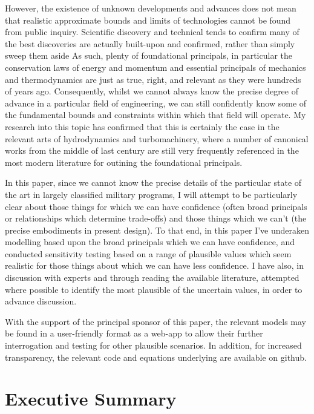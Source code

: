 \documentclass{article}\usepackage[]{graphicx}\usepackage[]{color}
\begin{document}
However, the existence of unknown developments and advances does not mean that realistic approximate bounds and limits of technologies cannot be found from public inquiry.  Scientific discovery and technical tends to confirm many of the best discoveries are actually built-upon and confirmed, rather than simply sweep them aside  As such, plenty of foundational principals, in particular the conservation laws of energy and momentum and essential principals of mechanics and thermodynamics are just as true, right, and relevant as they were hundreds of years ago.  Consequently, whilst we cannot always know the precise degree of advance in a particular field of engineering, we can still confidently know some of the fundamental bounds and constraints within which that field will operate.  My research into this topic has confirmed that this is certainly the case in the relevant arts of hydrodynamics and turbomachinery, where a number of canonical works from the middle of last century are still very frequently referenced in the most modern literature for outining the foundational principals.

In this paper, since we cannot know the precise details of the particular state of the art in largely classified military programs, I will attempt to be particularly clear about those things for which we can have confidence (often broad principals or relationships which determine trade-offs) and those things which we can't (the precise embodiments in present design).  To that end, in this paper I've underaken modelling based upon the broad principals which we can have confidence, and conducted sensitivity testing based on a range of plausible values which seem realistic for those things about which we can have less confidence. I have also, in discussion with experts and through reading the available literature, attempted where possible to identify the most plausible of the uncertain values, in order to advance discussion.

With the support of the principal sponsor of this paper, the relevant models may be found in a user-friendly format as a web-app to allow their further interrogation and testing for other plausible scenarios.  In addition, for increased transparency, the relevant code and equations underlying are available on github.

\newpage  \section{Executive Summary}
\end{document}
